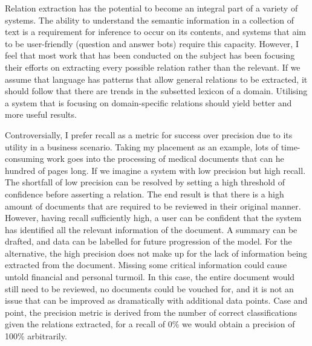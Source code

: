 \documentclass{ecmm427_assignment}
\begin{document}
Relation extraction has the potential to become an integral part of a variety of systems. The ability to understand the semantic information in a collection of text is a requirement for inference to occur on its contents, and systems that aim to be user-friendly (question and answer bots) require this capacity. However, I feel that most work that has been conducted on the subject has been focusing their efforts on extracting every possible relation rather than the relevant. If we assume that language has patterns that allow general relations to be extracted, it should follow that there are trends in the subsetted lexicon of a domain. Utilising a system that is focusing on domain-specific relations should yield better and more useful results. 
  
Controversially, I prefer recall as a metric for success over precision due to its utility in a business scenario. Taking my placement as an example, lots of time-consuming work goes into the processing of medical documents that can he hundred of pages long. If we imagine a system with low precision but high recall. The shortfall of low precision can be resolved by setting a high threshold of confidence before asserting a relation. The end result is that there is a high amount of documents that are required to be reviewed in their original manner. However, having recall sufficiently high, a user can be confident that the system has identified all the relevant information of the document. A summary can be drafted, and data can be labelled for future progression of the model. For the alternative, the high precision does not make up for the lack of information being extracted from the document. Missing some critical information could cause untold financial and personal turmoil. In this case, the entire document would still need to be reviewed, no documents could be vouched for, and it is not an issue that can be improved as dramatically with additional data points. Case and point, the precision metric is derived from the number of correct classifications given the relations extracted, for a recall of 0\% we would obtain a precision of 100\% arbitrarily.

\newpage

\end{document}
